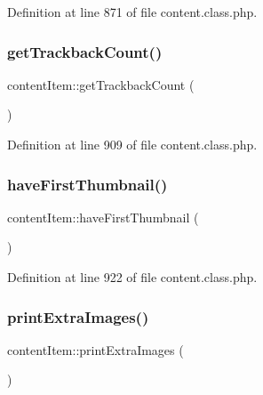 Definition at line 871 of file content.\+class.\+php.

\mbox{\label{classcontentItem_a197f56732733f1487d26ed23d29e94a6}} 
\subsubsection{\texorpdfstring{get\+Trackback\+Count()}{getTrackbackCount()}}
{\footnotesize\ttfamily content\+Item\+::get\+Trackback\+Count (\begin{DoxyParamCaption}{ }\end{DoxyParamCaption})}



Definition at line 909 of file content.\+class.\+php.

\mbox{\label{classcontentItem_a9e7fa4b2b4b3ce4a066d89b7f862be5a}} 
\subsubsection{\texorpdfstring{have\+First\+Thumbnail()}{haveFirstThumbnail()}}
{\footnotesize\ttfamily content\+Item\+::have\+First\+Thumbnail (\begin{DoxyParamCaption}{ }\end{DoxyParamCaption})}



Definition at line 922 of file content.\+class.\+php.

\mbox{\label{classcontentItem_acdff242f3298021a7ac9274a4191ebc7}} 
\subsubsection{\texorpdfstring{print\+Extra\+Images()}{printExtraImages()}}
{\footnotesize\ttfamily content\+Item\+::print\+Extra\+Images (\begin{DoxyParamCaption}{ }\end{DoxyParamCaption})}



